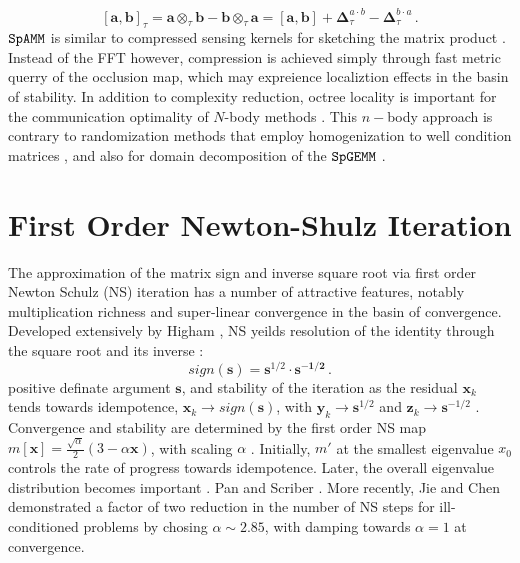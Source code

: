 \documentclass[letterpaper,twocolumn,amsmath,amsfont,amssymb,english,aps,jcp,preprintnumbers,groupaddress,nofootinbib,tightenlines]{revtex4}
\newcommand{\mat}[1]{\boldsymbol{#1}}
\newcommand{\ot}{ {\scriptstyle \otimes}_{ \tau } }
\begin{document}
\begin{equation}
\left[ \mat{a} , \mat{b} \right]_{\tau} = \mat{a} \ot \mat{b}-\mat{b} \ot \mat{a}  
=  \left[ \mat{a} , \mat{b} \right]
+ \mat{\Delta}^{a\cdot b}_{\tau} -\mat{\Delta}^{b\cdot a}_{\tau} \,.
\end{equation}
$\tt SpAMM$ is similar to compressed sensing kernels for sketching the matrix product \cite{Kutzkov2012, Pagh2013}.  Instead of
the FFT however, compression is achieved simply through fast metric querry of the occlusion map, which may expreience 
localiztion effects in the basin of stability.   In addition to complexity reduction, octree locality is 
important for the communication optimality of $N$-body methods \cite{}.   This $n-$body approach is contrary to 
randomization methods that employ homogenization to well condition matrices 
\cite{pan, DiahLi and Parket Scott},  and also for domain decomposition of the $\tt SpGEMM$ \cite{}.

\section{First Order Newton-Shulz Iteration}

The approximation of the matrix sign and inverse square root via first order Newton Schulz (NS) iteration 
has a number of attractive features, notably multiplication richness and super-linear convergence in the basin of convergence. 
Developed extensively by Higham \cite{}, NS  yeilds resolution of the identity through the square root and its inverse \cite{}:
\begin{equation}
sign \left( \mat{s} \right) =\mat{s}^{1/2} \cdot \mat{s^{-1/2}} \, .
\end{equation}
positive definate argument $\mat{s}$, and stability of the iteration as the residual $\mat{x}_k $ tends towards 
idempotence, $\mat{x}_k \rightarrow {sign}\left( \mat{s} \right) $, with 
 $\mat{y}_k \rightarrow \mat{s}^{1/2}$  and $\mat{z}_k \rightarrow \mat{s}^{-1/2}$ \cite{higham}. 
Convergence and stability are determined by the first order NS map $m[\mat{x}]=\frac{\sqrt{\alpha}}{2} \left(3-\alpha \mat{x} \right)$, 
with scaling $\alpha$ \cite{}. 
Initially, $m'$ at the smallest eigenvalue $x_0$ controls the rate of progress towards idempotence.  
Later, the overall eigenvalue distribution becomes important \cite{}. Pan and Scriber .  More recently, 
Jie and Chen demonstrated a factor of two reduction 
in the number of NS steps for ill-conditioned problems by chosing $\alpha \sim 2.85$, with damping towards $\alpha=1$ at 
convergence.  
\end{document}
